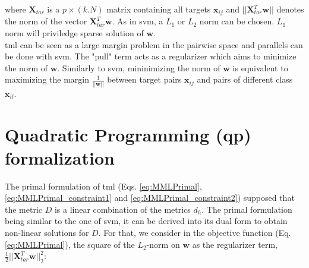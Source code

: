 \noindent where $\textbf{X}_{tar}$ is a $p \times (k.N)$ matrix  containing all targets $\textbf{x}_{ij}$ and $||\textbf{X}_{tar}^T \textbf{w}||$ denotes the norm of the vector $\textbf{X}_{tar}^T \textbf{w}$. As in {\sc svm}, a $L_1$ or $L_2$ norm can be chosen. $L_1$ norm will priviledge sparse solution of $\textbf{w}$. \\
{\sc tml} can be seen as a large margin problem in the pairwise space and parallels can be done with {\sc svm}. The "pull" term acts as a regularizer which aims to minimize the norm of $\textbf{w}$. Similarly to {\sc svm}, mininimizing the norm of $\textbf{w}$ is equivalent to maximizing the margin $\frac{1}{||\textbf{w}||}$ between target pairs $\textbf{x}_{ij}$ and pairs of different class $\textbf{x}_{il}$. 

\section{Quadratic Programming ({\sc qp}) formalization}
The primal formulation of {\sc tml} (Eqs. \ref{eq:MMLPrimal}, \ref{eq:MMLPrimal_constraint1} and \ref{eq:MMLPrimal_constraint2}) supposed that the metric $D$ is a linear combination of the metrics $d_h$. The primal formulation being similar to the one of {\sc svm}, it can be derived into its dual form to obtain non-linear solutions for $D$.
For that, we consider in the objective function (Eq. \ref{eq:MMLPrimal}), the square of the $L_2$-norm on $\textbf{w}$ as the regularizer term, $\frac{1}{2}||\textbf{X}_{tar}^T \textbf{w}||_2^2$:

